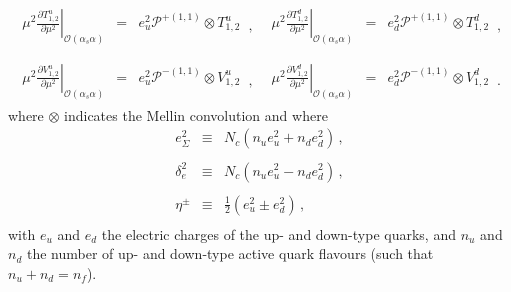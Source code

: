 \begin{equation}
\begin{array}{ll}
\begin{array}{rcl}
\displaystyle \left.\mu^2\frac{\partial T^u_{1,2}}{\partial \mu^2}\right|_{\mathcal{O}(\alpha_s \alpha)} &=&
\displaystyle e_u^2\mathcal{P}^{+(1,1)}\otimes T^u_{1,2}
\end{array}\,, &
\begin{array}{rcl}
\displaystyle \left.\mu^2\frac{\partial T^d_{1,2}}{\partial \mu^2}\right|_{\mathcal{O}(\alpha_s \alpha)} &=&
\displaystyle e_d^2\mathcal{P}^{+(1,1)} \otimes T^d_{1,2}
\end{array}\,,
\\
\\
\begin{array}{rcl}
\displaystyle \left.\mu^2\frac{\partial V^u_{1,2}}{\partial \mu^2}\right|_{\mathcal{O}(\alpha_s \alpha)} &=&
\displaystyle e_u^2\mathcal{P}^{-(1,1)} \otimes V^u_{1,2}
\end{array}\,, &
\begin{array}{rcl}
\displaystyle \left.\mu^2\frac{\partial V^d_{1,2}}{\partial \mu^2}\right|_{\mathcal{O}(\alpha_s \alpha)} &=&
\displaystyle e_d^2\mathcal{P}^{-(1,1)}\otimes V^d_{1,2}
\end{array}\,.
\end{array}
\end{equation}
where $\otimes$ indicates the Mellin convolution and where 
\begin{equation}
\begin{array}{rcl}
e_{\Sigma}^{2}& \equiv &\displaystyle
N_c(n_ue_{u}^{2}+n_de_{d}^{2})\,,\\
\\
\delta_e^2 & \equiv &\displaystyle N_c(n_u e_u^2 -n_d e_d^2)\,,\\
\\
\eta^{\pm} & \equiv & \displaystyle \frac{1}{2}\left(e_{u}^{2}\pm
  e_{d}^{2}\right)\,,\\
\end{array}
\end{equation}
with $e_u$ and $e_d$ the electric charges of the up- and down-type
quarks, and $n_u$ and $n_d$ the number of up- and down-type active
quark flavours (such that $n_u+n_d=n_f$).
%

